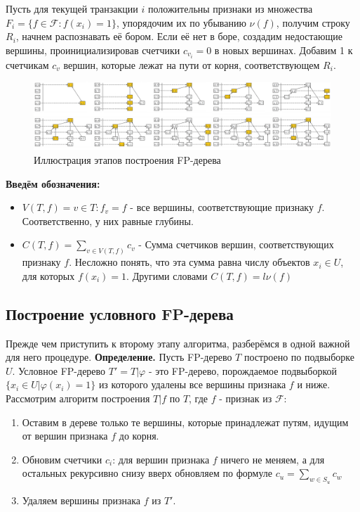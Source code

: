 Пусть для текущей транзакции $i$ положительны признаки из множества $F_i = \{f \in \mathcal{F}: f(x_i) = 1 \}$, упорядочим их по убыванию $\nu(f)$, получим строку $R_i$, начнем распознавать её бором. Если её нет в боре, создадим недостающие вершины, проинициализировав счетчики $c_{v_i} = 0$ в новых вершинах. Добавим 1 к счетчикам $c_v$ вершин, которые лежат на пути от корня, соответствующем $R_i$.

\begin{figure}[h]
    \centering
    \includegraphics[width=1\linewidth]{chapters/rules/images/fp-tree-stages-example.png}
    \caption{Иллюстрация этапов построения FP-дерева}
    \label{fig:enter-label}
\end{figure}

\textbf{Введём обозначения:}

\begin{itemize}
    \item $V(T, f) = {v \in T: f_v = f}$ - все вершины, соответствующие признаку $f$. Соответственно, у них равные глубины.
    \item $C(T, f) = \displaystyle\sum_{v \in V(T, f)} c_v$ - Сумма счетчиков вершин, соответствующих признаку $f$. Несложно понять, что эта сумма равна числу объектов $x_i \in U$, для которых $f(x_i) = 1$. Другими словами $C(T, f) = l\nu(f)$
\end{itemize}


\subsection{Построение условного FP-дерева}

Прежде чем приступить к второму этапу алгоритма, разберёмся в одной важной для него процедуре. 
\newline\newline
\textbf{Определение.} Пусть FP-дерево $T$ построено по подвыборке $U$. Условное FP-дерево $T' = T|\varphi$ - это FP-дерево, порождаемое подвыборкой $\{x_i \in U| \varphi(x_i) = 1 \}$ из которого удалены все вершины признака $f$ и ниже.
\newline\newline
Рассмотрим алгоритм построения $T|f$ по $T$, где $f$ - признак из $\mathcal{F}$:
\begin{enumerate}
    \item Оставим в дереве только те вершины, которые принадлежат путям, идущим от вершин признака $f$ до корня. 
    \item Обновим счетчики $c_i$: для вершин признака $f$ ничего не меняем, а для остальных рекурсивно снизу вверх обновляем по формуле $c_u = \displaystyle\sum_{w \in S_u} c_w$
    \item Удаляем вершины признака $f$ из $T'$.
\end{enumerate}

